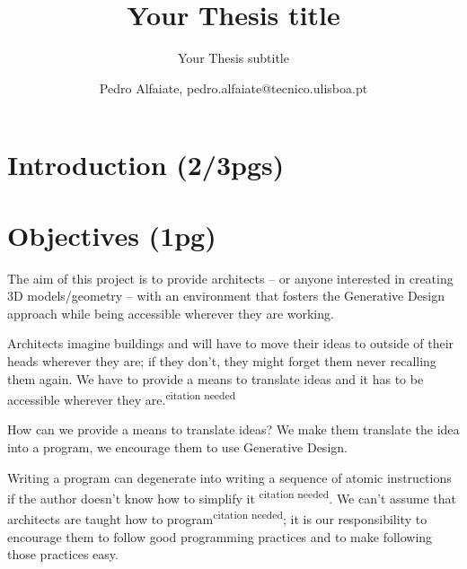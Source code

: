 \documentclass{./llncs2e/llncs}
\begin{document}
\title{Your Thesis title}

\subtitle{Your Thesis subtitle}
\author{Pedro Alfaiate, pedro.alfaiate@tecnico.ulisboa.pt}

\maketitle

\begin{abstract}

\end{abstract}
\begin{keywords}

\end{keywords}
\section{Introduction (2/3pgs)}

\section{Objectives (1pg)}
The aim of this project is to provide architects -- or anyone interested in creating 3D models/geometry -- with an environment that fosters the Generative Design approach while being accessible wherever they are working.

Architects imagine buildings and will have to move their ideas to outside of their heads wherever they are; if they don't, they might forget them never recalling them again. We have to provide a means to translate ideas and it has to be accessible wherever they are.\textsuperscript{citation needed}

How can we provide a means to translate ideas? We make them translate the idea into a program, we encourage them to use Generative Design.

Writing a program can degenerate into writing a sequence of atomic instructions if the author doesn't know how to simplify it \textsuperscript{citation needed}. We can't assume that architects are taught how to program\textsuperscript{citation needed}; it is our responsibility to encourage them to follow good programming practices and to make following those practices easy.
\end{document}
